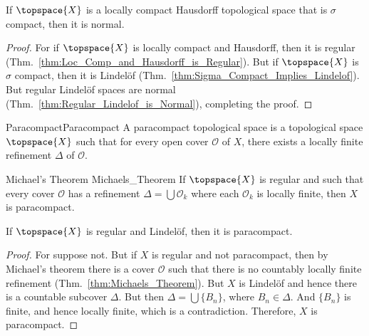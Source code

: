         \begin{theorem}
            \label{thm:Sigma_Compact_Loc_Compact_Hausdorff_is_Normal}%
            If $\topspace{X}$ is a locally compact Hausdorff topological
            space that is $\sigma$ compact, then it is normal.
        \end{theorem}
        \begin{proof}
            For if $\topspace{X}$ is locally compact and Hausdorff, then it
            is regular (Thm.~\ref{thm:Loc_Comp_and_Hausdorff_is_Regular}).
            But if $\topspace{X}$ is $\sigma$ compact, then it is
            Lindel\"{o}f (Thm.~\ref{thm:Sigma_Compact_Implies_Lindelof}).
            But regular Lindel\"{o}f spaces are normal
            (Thm.~\ref{thm:Regular_Lindelof_is_Normal}), completing the
            proof.
        \end{proof}
        \begin{fdefinition}{Paracompact}{Paracompact}
            A paracompact topological space is a topological space
            $\topspace{X}$ such that for every open cover $\mathcal{O}$ of $X$,
            there exists a locally finite refinement $\Delta$ of $\mathcal{O}$.
        \end{fdefinition}
        \begin{ftheorem}{Michael's Theorem}
                        {Michaels_Theorem}
            If $\topspace{X}$ is regular and such that every cover
            $\mathcal{O}$ has a refinement $\Delta=\bigcup\mathcal{O}_{k}$
            where each $\mathcal{O}_{k}$ is locally finite, then $X$ is
            paracompact.
        \end{ftheorem}
        \begin{theorem}
            \label{thm:Regular_Lindelof_is_Paracompact}%
            If $\topspace{X}$ is regular and Lindel\"{o}f, then it is
            paracompact.
        \end{theorem}
        \begin{proof}
            For suppose not. But if $X$ is regular and not paracompact, then
            by Michael's theorem there is a cover $\mathcal{O}$ such that
            there is no countably locally finite refinement
            (Thm.~\ref{thm:Michaels_Theorem}). But $X$ is Lindel\"{o}f and
            hence there is a countable subcover $\Delta$. But then
            $\Delta=\bigcup\{B_{n}\}$, where $B_{n}\in\Delta$. And
            $\{B_{n}\}$ is finite, and hence locally finite, which is a
            contradiction. Therefore, $X$ is paracompact.
        \end{proof}
